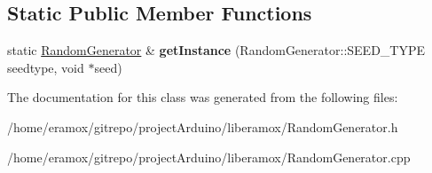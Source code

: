 \subsection*{Static Public Member Functions}
\begin{DoxyCompactItemize}
\item 
static \hyperlink{classliberamox_1_1RandomGenerator}{Random\+Generator} \& {\bfseries get\+Instance} (Random\+Generator\+::\+S\+E\+E\+D\+\_\+\+T\+Y\+PE seedtype, void $\ast$seed)\hypertarget{classliberamox_1_1RandomGenerator_afe17b05a33df5e7dc99fb87ab9077167}{}\label{classliberamox_1_1RandomGenerator_afe17b05a33df5e7dc99fb87ab9077167}

\end{DoxyCompactItemize}


The documentation for this class was generated from the following files\+:\begin{DoxyCompactItemize}
\item 
/home/eramox/gitrepo/project\+Arduino/liberamox/Random\+Generator.\+h\item 
/home/eramox/gitrepo/project\+Arduino/liberamox/Random\+Generator.\+cpp\end{DoxyCompactItemize}
